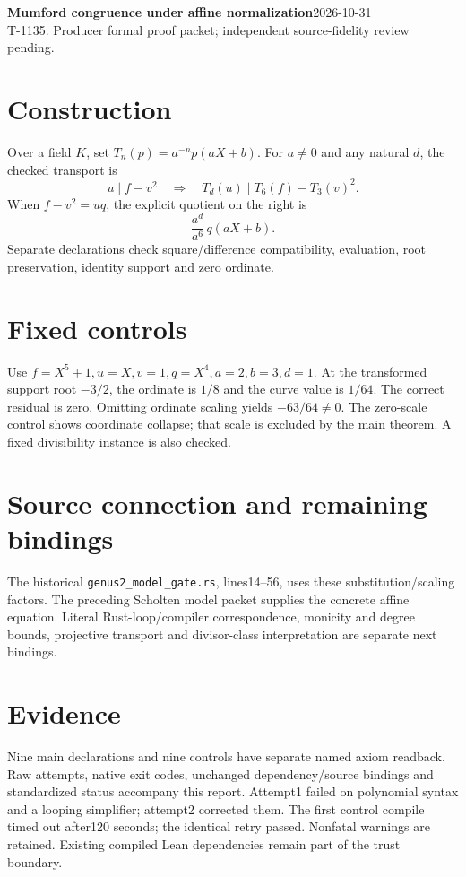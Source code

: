 \documentclass[10pt]{article}
\begin{document}
\textbf{Mumford congruence under affine normalization}\hfill 2026-10-31\\T-1135. Producer formal proof packet; independent source-fidelity review pending.
\section*{Construction}
Over a field $K$, set $T_n(p)=a^{-n}p(aX+b)$. For $a\ne0$ and any natural $d$, the checked transport is
\[u\mid f-v^2\quad\Longrightarrow\quad T_d(u)\mid T_6(f)-T_3(v)^2.\]
When $f-v^2=uq$, the explicit quotient on the right is
\[\frac{a^d}{a^6}\,q(aX+b).\]
Separate declarations check square/difference compatibility, evaluation, root preservation, identity support and zero ordinate.
\begin{center}\end{center}
\section*{Fixed controls}
Use $f=X^5+1,u=X,v=1,q=X^4,a=2,b=3,d=1$. At the transformed support root $-3/2$, the ordinate is $1/8$ and the curve value is $1/64$. The correct residual is zero. Omitting ordinate scaling yields $-63/64\ne0$. The zero-scale control shows coordinate collapse; that scale is excluded by the main theorem. A fixed divisibility instance is also checked.
\section*{Source connection and remaining bindings}
The historical \texttt{genus2\_model\_gate.rs}, lines14--56, uses these substitution/scaling factors. The preceding Scholten model packet supplies the concrete affine equation. Literal Rust-loop/compiler correspondence, monicity and degree bounds, projective transport and divisor-class interpretation are separate next bindings.
\section*{Evidence}
Nine main declarations and nine controls have separate named axiom readback. Raw attempts, native exit codes, unchanged dependency/source bindings and standardized status accompany this report. Attempt1 failed on polynomial syntax and a looping simplifier; attempt2 corrected them. The first control compile timed out after120 seconds; the identical retry passed. Nonfatal warnings are retained. Existing compiled Lean dependencies remain part of the trust boundary.
\end{document}
